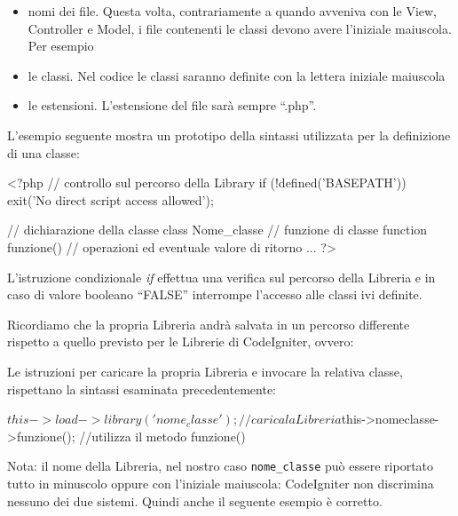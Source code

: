 \begin{itemize}
\item nomi dei file. Questa volta, contrariamente a quando avveniva con le View, Controller e Model, i file contenenti le classi devono avere l'iniziale maiuscola. Per esempio 
\item le classi. Nel codice le classi saranno definite con la lettera iniziale maiuscola
\item le estensioni. L'estensione del file sarà sempre ``.php''.
\end{itemize}

L'esempio seguente mostra un prototipo della sintassi utilizzata per la definizione di una classe:

\begin{code}
<?php 
// controllo sul percorso della Library
if (!defined('BASEPATH')) exit('No direct script access allowed');  

// dichiarazione della classe
class Nome_classe {
  // funzione di classe
  function funzione() {
    // operazioni ed eventuale valore di ritorno
    ...
	}
}
?>
\end{code}

L'istruzione condizionale \emph{if} effettua una verifica sul percorso della Libreria e in caso di valore booleano ``FALSE'' interrompe l'accesso alle classi ivi definite.

Ricordiamo che la propria Libreria andrà salvata in un percorso differente rispetto a quello previsto per le Librerie di CodeIgniter, ovvero:


Le istruzioni per caricare la propria Libreria e invocare la relativa classe, rispettano la sintassi esaminata precedentemente:

\begin{code}
$this->load->library('nome_classe'); //carica la Libreria
$this->nomeclasse->funzione(); //utilizza il metodo funzione()
\end{code}

Nota: il nome della Libreria, nel nostro caso \verb|nome_classe| può essere riportato tutto in minuscolo oppure con l'iniziale maiuscola: CodeIgniter non discrimina nessuno dei due sistemi. Quindi anche il seguente esempio è corretto.


